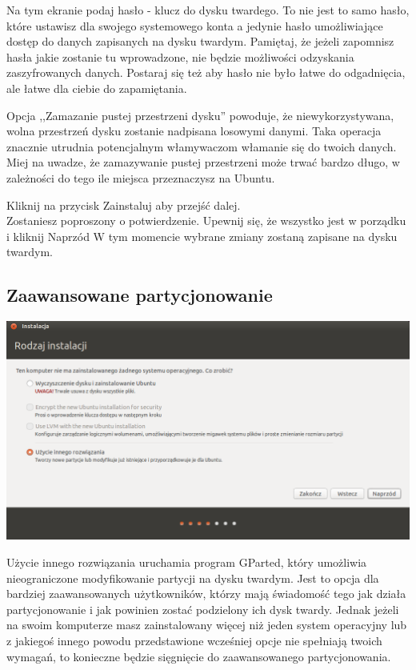 Na tym ekranie podaj hasło - klucz do dysku twardego. To nie jest to samo hasło, które ustawisz dla swojego systemowego konta a jedynie hasło umożliwiające dostęp do danych zapisanych na dysku twardym. Pamiętaj, że jeżeli zapomnisz hasła jakie zostanie tu wprowadzone, nie będzie możliwości odzyskania zaszyfrowanych danych. Postaraj się też aby hasło nie było łatwe do odgadnięcia, ale łatwe dla ciebie do zapamiętania.

Opcja ,,Zamazanie pustej przestrzeni dysku'' powoduje, że niewykorzystywana, wolna przestrzeń dysku zostanie nadpisana losowymi danymi. Taka operacja znacznie utrudnia potencjalnym włamywaczom włamanie się do twoich danych. Miej na uwadze, że zamazywanie pustej przestrzeni może trwać bardzo długo, w zależności do tego ile miejsca przeznaczysz na Ubuntu.
\begin{flushright}
Kliknij na przycisk \textcolor{ubuntu_orange}{Zainstaluj} aby przejść dalej.\\
Zostaniesz poproszony o potwierdzenie. Upewnij się, że wszystko jest w porządku i kliknij \textcolor{ubuntu_orange}{Naprzód}
W tym momencie wybrane zmiany zostaną zapisane na dysku twardym.\\
\end{flushright}
\clearpage
\subsection{Zaawansowane partycjonowanie}
\begin{center}
        \includegraphics[width=\linewidth]{images/instalator_partycjonowanie_gparted1.png}
\end{center}

\textcolor{ubuntu_orange}{Użycie innego rozwiązania} uruchamia program GParted, który umożliwia nieograniczone modyfikowanie partycji na dysku twardym. Jest to opcja dla bardziej zaawansowanych użytkowników, którzy mają świadomość tego jak działa partycjonowanie i jak powinien zostać podzielony ich dysk twardy. Jednak jeżeli na swoim komputerze masz zainstalowany więcej niż jeden system operacyjny lub z jakiegoś innego powodu przedstawione wcześniej opcje nie spełniają twoich wymagań, to konieczne będzie sięgnięcie do zaawansowanego partycjonowania.

